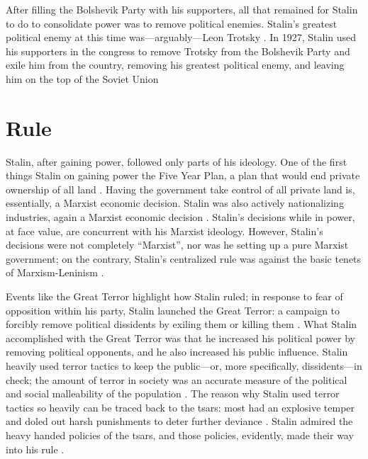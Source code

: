 \documentclass[a4paper,12pt]{article}
\begin{document}
        After filling the Bolshevik Party with his supporters, all that remained for Stalin to do to
        consolidate power was to remove political enemies. Stalin's greatest political enemy at this
        time was---arguably---Leon Trotsky \cite[167]{kortm}. In 1927, Stalin used his supporters in
        the congress to remove Trotsky from the Bolshevik Party and exile him from the country,
        removing his greatest political enemy, and leaving him on the top of the Soviet Union


    \section{Rule}

        Stalin, after gaining power, followed only parts of his ideology. One of the first things
        Stalin on gaining power the Five Year Plan, a plan that would end private ownership of all
        land \cite[51]{basilj}. Having the government take control of all private land is,
        essentially, a Marxist economic decision. Stalin was also actively nationalizing industries,
        again a Marxist economic decision \cite[44]{remingtont}. Stalin's decisions while in power,
        at face value, are concurrent with his Marxist ideology. However, Stalin's decisions were
        not completely ``Marxist'', nor was he setting up a pure Marxist government; on the
        contrary, Stalin's centralized rule was against the basic tenets of Marxism-Leninism
        \cite[49]{remingtont}.

        Events like the Great Terror highlight how Stalin ruled; in response to fear of opposition
        within his party, Stalin launched the Great Terror: a campaign to forcibly remove political
        dissidents by exiling them or killing them \cite[716]{kuromiyah}. What Stalin accomplished
        with the Great Terror was that he increased his political power by removing political
        opponents, and he also increased his public influence. Stalin heavily used terror tactics to
        keep the public---or, more specifically, dissidents---in check; the amount of terror in
        society was an accurate measure of the political and social malleability of the population
        \cite[386]{conquestr}. The reason why Stalin used terror tactics so heavily can be traced
        back to the tsars: most had an explosive temper and doled out harsh punishments to deter
        further deviance \cite[64]{hingleyr}. Stalin admired the heavy handed policies of the tsars,
        and those policies, evidently, made their way into his rule \cite[26]{remingtont}.
\end{document}
